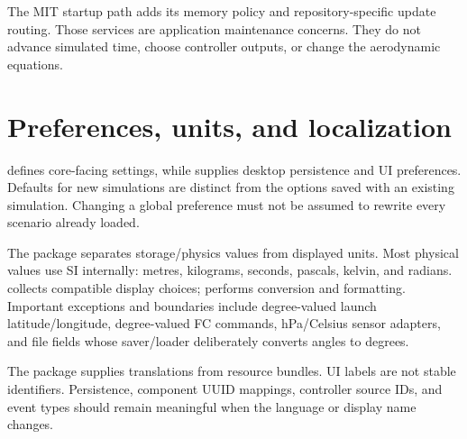 
The MIT startup path adds its memory policy and repository-specific update routing. Those services are application maintenance concerns. They do not advance simulated time, choose controller outputs, or change the aerodynamic equations.

\section{Preferences, units, and localization}
 defines core-facing settings, while  supplies desktop persistence and UI preferences. Defaults for new simulations are distinct from the options saved with an existing simulation. Changing a global preference must not be assumed to rewrite every scenario already loaded.

The  package separates storage/physics values from displayed units. Most physical values use SI internally: metres, kilograms, seconds, pascals, kelvin, and radians.  collects compatible display choices;  performs conversion and formatting. Important exceptions and boundaries include degree-valued launch latitude/longitude, degree-valued FC commands, hPa/Celsius sensor adapters, and file fields whose saver/loader deliberately converts angles to degrees.

The  package supplies translations from resource bundles. UI labels are not stable identifiers. Persistence, component UUID mappings, controller source IDs, and event types should remain meaningful when the language or display name changes.

